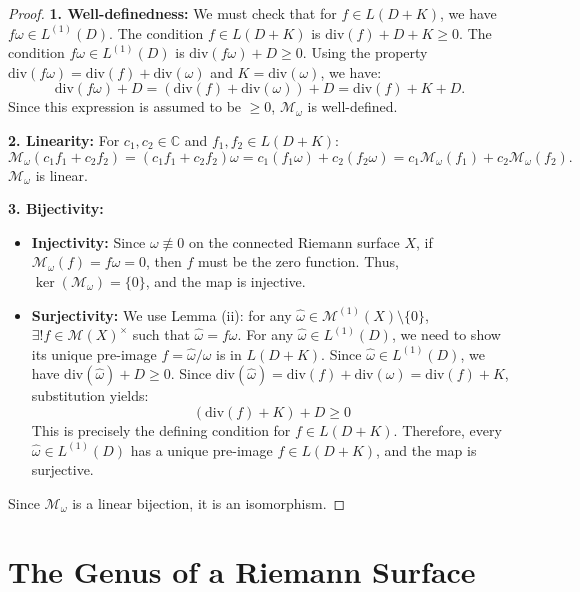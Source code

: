 \documentclass{article}
\begin{document}
\begin{proof}
\textbf{1. Well-definedness:}
We must check that for $f \in L(D+K)$, we have $f\omega \in L^{(1)}(D)$.
The condition $f \in L(D+K)$ is $\mathrm{div}(f) + D + K \ge 0$.
The condition $f\omega \in L^{(1)}(D)$ is $\mathrm{div}(f\omega) + D \ge 0$.
Using the property $\mathrm{div}(f\omega) = \mathrm{div}(f) + \mathrm{div}(\omega)$ and $K = \mathrm{div}(\omega)$, we have:
$$\mathrm{div}(f\omega) + D = (\mathrm{div}(f) + \mathrm{div}(\omega)) + D = \mathrm{div}(f) + K + D.$$
Since this expression is assumed to be $\ge 0$, $\mathcal{M}_\omega$ is well-defined.

\textbf{2. Linearity:}
For $c_1, c_2 \in \mathbb{C}$ and $f_1, f_2 \in L(D+K)$:
$$\mathcal{M}_\omega(c_1 f_1 + c_2 f_2) = (c_1 f_1 + c_2 f_2)\omega = c_1 (f_1 \omega) + c_2 (f_2 \omega) = c_1 \mathcal{M}_\omega(f_1) + c_2 \mathcal{M}_\omega(f_2).$$
$\mathcal{M}_\omega$ is linear.

\textbf{3. Bijectivity:}
\begin{itemize}
    \item \textbf{Injectivity:} Since $\omega \not\equiv 0$ on the connected Riemann surface $X$, if $\mathcal{M}_\omega(f) = f\omega = 0$, then $f$ must be the zero function. Thus, $\ker(\mathcal{M}_\omega) = \{0\}$, and the map is injective.
    \item \textbf{Surjectivity:}
    We use Lemma (ii): for any $\hat{\omega} \in \mathcal{M}^{(1)}(X) \setminus \{0\}$, $\exists ! f \in \mathcal{M}(X)^\times$ such that $\hat{\omega} = f\omega$.
    For any $\hat{\omega} \in L^{(1)}(D)$, we need to show its unique pre-image $f = \hat{\omega}/\omega$ is in $L(D+K)$.
    Since $\hat{\omega} \in L^{(1)}(D)$, we have $\mathrm{div}(\hat{\omega}) + D \ge 0$.
    Since $\mathrm{div}(\hat{\omega}) = \mathrm{div}(f) + \mathrm{div}(\omega) = \mathrm{div}(f) + K$, substitution yields:
    $$(\mathrm{div}(f) + K) + D \ge 0$$
    This is precisely the defining condition for $f \in L(D+K)$.
    Therefore, every $\hat{\omega} \in L^{(1)}(D)$ has a unique pre-image $f \in L(D+K)$, and the map is surjective.
\end{itemize}
Since $\mathcal{M}_\omega$ is a linear bijection, it is an isomorphism.
\end{proof}


\newpage
\section{The Genus of a Riemann Surface}
\end{document}

